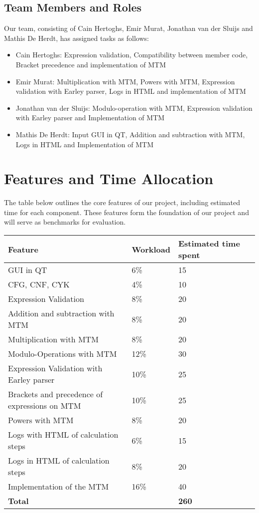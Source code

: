 \documentclass[a4paper,12pt]{article}
\begin{document}
\subsection*{Team Members and Roles}
Our team, consisting of Cain Hertoghs, Emir Murat, Jonathan van der Sluijs and Mathis De Herdt, has assigned tasks as follows:
\begin{itemize}
    \item Cain Hertoghs: Expression validation, Compatibility between member code, Bracket precedence and implementation of MTM
    \item Emir Murat: Multiplication with MTM, Powers with MTM, Expression validation with Earley parser, Logs in HTML and implementation of MTM
    \item Jonathan van der Sluijs: Modulo-operation with MTM, Expression validation with Earley parser and Implementation of MTM
    \item Mathis De Herdt: Input GUI in QT, Addition and subtraction with MTM, Logs in HTML and Implementation of MTM
\end{itemize}

\section*{Features and Time Allocation}

The table below outlines the core features of our project, including estimated time for each component. These features form the foundation of our project and will serve as benchmarks for evaluation.

\begin{longtable}{|p{5cm}|p{2cm}|p{2cm}|p{2cm}|}
\hline
\textbf{Feature} & \textbf{Workload} & \textbf{Estimated time spent} \\
\hline
GUI in QT & 6\% & 15  \\
\hline
CFG, CNF, CYK & 4\% & 10  \\
\hline
Expression Validation & 8\% & 20  \\
\hline
Addition and subtraction with MTM & 8\% & 20  \\
\hline
Multiplication with MTM & 8\% & 20  \\
\hline
Modulo-Operations with MTM & 12\% & 30  \\
\hline
Expression Validation with Earley parser & 10\% & 25 \\
\hline
Brackets and precedence of expressions on MTM & 10\% & 25  \\
\hline
Powers with MTM & 8\% & 20  \\
\hline
Logs with HTML of calculation steps & 6\% & 15  \\
\hline
Logs in HTML of calculation steps & 8\% & 20  \\
\hline
Implementation of the MTM & 16\% & 40  \\
\hline
\textbf{Total} & & \textbf{260}  \\
\hline
\end{longtable}
\end{document}
